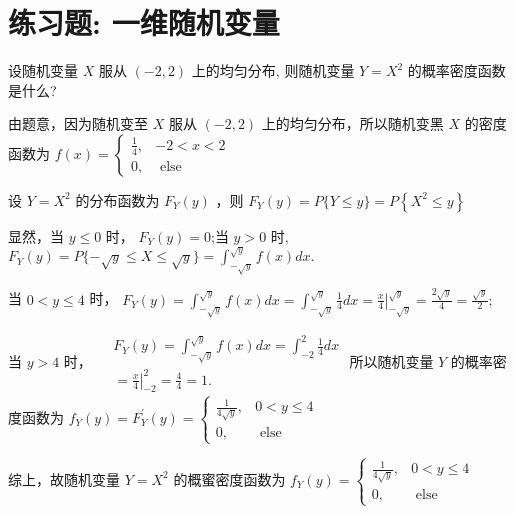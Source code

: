 \section*{练习题: 一维随机变量}

\begin{exercise}
    设随机变量 $X$ 服从 $(-2,2)$ 上的均匀分布, 则随机变量 $Y=X^2$ 的概率密度函数是什么? 
  \end{exercise}
  
  \begin{solution*}
    由题意，因为随机变至 $X$ 服从 $(-2,2)$ 上的均匀分布，所以随机变黑 $X$ 的密度函数为
    $
    f(x)= \begin{cases}\frac{1}{4}, & -2<x<2 \\ 0, & \text { else }\end{cases}
    $
    
    设 $Y=X^2$ 的分布函数为 $F_Y(y)$ ，则
    $
    F_Y(y)=P\{Y \leq y\}=P\left\{X^2 \leq y\right\}
    $
    
    显然，当 $y \leq 0$ 时， $F_Y(y)=0$;当 $y>0$ 时,
    $
    F_Y(y)=P\{-\sqrt{y} \leq X \leq \sqrt{y}\}
    =\int_{-\sqrt{y}}^{\sqrt{y}} f(x) d x \text {. }
    $
    
    当 $0<y \leq 4$ 时，
    $
    F_Y(y)=\int_{-\sqrt{y}}^{\sqrt{y}} f(x) d x=\int_{-\sqrt{y}}^{\sqrt{y}} \frac{1}{4} d x
    =\left.\frac{x}{4}\right|_{-\sqrt{y}} ^{\sqrt{y}}=\frac{2 \sqrt{y}}{4}=\frac{\sqrt{y}}{2} ;
    $
    
    当 $y>4$ 时，
    $
    \begin{aligned}
    & F_Y(y)=\int_{-\sqrt{y}}^{\sqrt{y}} f(x) d x=\int_{-2}^2 \frac{1}{4} d x \\
    & =\left.\frac{x}{4}\right|_{-2} ^2=\frac{4}{4}=1 .
    \end{aligned}
    $
    所以随机变量 $Y$ 的概率密度函数为
    $
    f_Y(y)=F_Y^{\prime}(y)= \begin{cases}\frac{1}{4 \sqrt{y}}, & 0<y \leq 4 \\ 0, & \text { else }\end{cases}
    $
    
    综上，故随机变量 $Y=X^2$ 的概蜜密度函数为
    $
    f_Y(y)= \begin{cases}\frac{1}{4 \sqrt{y}}, & 0<y \leq 4 \\ 0, & \text { else }\end{cases}
    $ 
  \end{solution*}